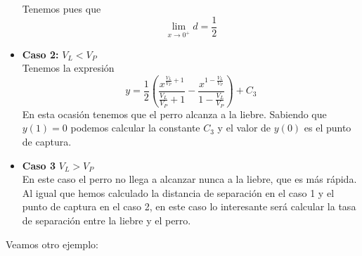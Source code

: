 \documentclass{mathnotes}
\begin{document}
\begin{example}
\begin{itemize}
Tenemos pues que $$\lim_{x\to 0^+} d = \frac{1}{2}$$
\item \textbf{Caso 2:} $V_L \lt V_P$\\
Tenemos la expresión $$y=\frac{1}{2}(\frac{x^{\frac{V_L}{V_P}+1}}{\frac{V_L}{V_P}+1}-\frac{x^{1-\frac{V_L}{V_P}}}{1-\frac{V_L}{V_P}})+C_3$$
En esta ocasión tenemos que el perro alcanza a la liebre. Sabiendo que $y(1) = 0$ podemos calcular la constante $C_3$ y el valor de $y(0)$ es el punto de captura.
\item \textbf{Caso 3} $V_L \gt V_P$\\
En este caso el perro no llega a alcanzar nunca a la liebre, que es más rápida. Al igual que hemos calculado la distancia de separación en el caso 1 y el punto de captura en el caso 2, en este caso lo interesante será calcular la tasa de separación entre la liebre y el perro.
\end{itemize}
\end{example}

Veamos otro ejemplo:
\end{document}
